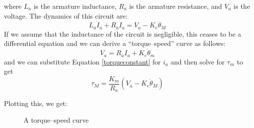 \documentclass[]{article}
\begin{document}
\noindent
where $L_{a}$ is the armature inductance, $R_{a}$ is the armature resistance, and $V_{a}$ is the voltage. The dynamics of this circuit are:
\begin{displaymath}
	L_{a}\dot{I}_{a} + R_{a}I_{a} = V_{a} - K_{e}\dot{\theta}_{M}
\end{displaymath}
If we assume that the inductance of the circuit is negligible, this ceases to be a differential equation and we can derive a ``torque--speed'' curve as follows:
\begin{displaymath}
	V_{a} = R_{a}I_{a} + K_{e}\dot{\theta}_{m}
\end{displaymath}
and we can substitute Equation \ref{torqueconstant} for $i_{a}$ and then solve for $\tau_{m}$ to get
\begin{displaymath}
	\tau_{M} = \frac{K_{m}}{ R_{a}}\left(V_{a} - K_{e}\dot{\theta}_{M}\right)
\end{displaymath}

\pagebreak
\noindent
Plotting this, we get:
\begin{figure}[h!]
    \centering
    \caption{A torque--speed curve}
\end{figure}
\end{document}
